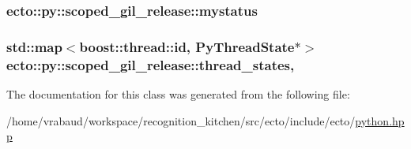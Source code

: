 \subsubsection[{mystatus}]{ ecto\+::py\+::scoped\+\_\+gil\+\_\+release\+::mystatus\hspace{0.3cm}{\ttfamily [private]}}\label{classecto_1_1py_1_1scoped__gil__release_a888a6813c86b9bbd2d5cd0d4a0f7e2f2}
\hypertarget{classecto_1_1py_1_1scoped__gil__release_a5ecad50e9899f01f3779ac22009af5a4}{}
\subsubsection[{thread\+\_\+states}]{\setlength{\rightskip}{0pt plus 5cm}std\+::map$<$boost\+::thread\+::id, Py\+Thread\+State$\ast$$>$ ecto\+::py\+::scoped\+\_\+gil\+\_\+release\+::thread\+\_\+states\hspace{0.3cm}{\ttfamily [static]}, {\ttfamily [private]}}\label{classecto_1_1py_1_1scoped__gil__release_a5ecad50e9899f01f3779ac22009af5a4}


The documentation for this class was generated from the following file\+:\begin{DoxyCompactItemize}
\item 
/home/vrabaud/workspace/recognition\+\_\+kitchen/src/ecto/include/ecto/\hyperlink{python_8hpp}{python.\+hpp}\end{DoxyCompactItemize}

